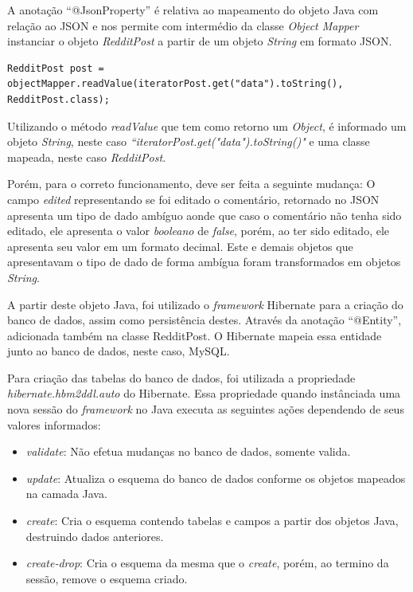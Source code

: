 A anotação ``@JsonProperty'' é relativa ao
mapeamento do objeto Java com relação ao \ac{JSON} e nos permite com
intermédio da classe \textit{Object Mapper} instanciar o objeto
\textit{RedditPost} a partir de um objeto \textit{String} em formato \ac{JSON}.

\begin{lstlisting}
RedditPost post = objectMapper.readValue(iteratorPost.get("data").toString(),
RedditPost.class);
\end{lstlisting}

Utilizando o método \textit{readValue} que tem como retorno um \textit{Object},
é informado um objeto \textit{String}, neste caso
\textit{``iteratorPost.get("data").toString()"} e uma classe mapeada, neste caso
\textit{RedditPost}.

Porém, para o correto funcionamento, deve ser feita a seguinte mudança: O campo
\textit{edited} representando se foi editado o comentário, retornado no
\ac{JSON} apresenta um tipo de dado ambíguo aonde que caso o comentário não tenha sido editado, ele apresenta o valor \textit{booleano} de \textit{false}, porém, ao ter sido editado, ele apresenta
seu valor em um formato decimal. Este e demais objetos que apresentavam o tipo
de dado de forma ambígua foram transformados em objetos \textit{String}.


A partir deste objeto Java, foi utilizado o \textit{framework} Hibernate para a
criação do banco de dados, assim como persistência destes. Através da anotação
``@Entity'', adicionada também na classe RedditPost. O Hibernate mapeia essa
entidade junto ao banco de dados, neste caso, MySQL.

Para criação das tabelas do banco de dados, foi utilizada a propriedade
\textit{hibernate.hbm2ddl.auto} do Hibernate. Essa propriedade quando
instânciada uma nova sessão do \textit{framework} no Java executa as seguintes
ações dependendo de seus valores informados:


\begin{itemize}
  \item \textit{validate}: Não efetua mudanças no banco de dados, somente
  valida.
  \item \textit{update}: Atualiza o esquema do banco de dados conforme os
  objetos mapeados na camada Java.
  \item \textit{create}: Cria o esquema contendo tabelas e campos a partir dos
  objetos Java, destruindo dados anteriores.
  \item \textit{create-drop}: Cria o esquema da mesma que o \textit{create},
  porém, ao termino da sessão, remove o esquema criado.
\end{itemize}

